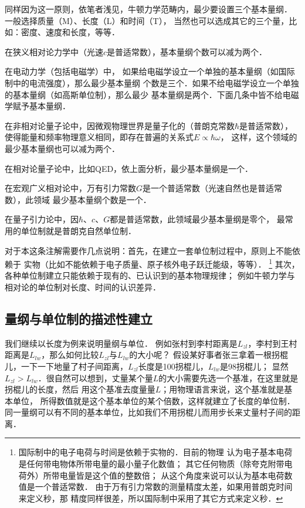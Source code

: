 \begin{remark}\label{chunit-dim:remark_num}
    同样因为这一原则，依笔者浅见，牛顿力学范畴内，最少要设置三个基本量纲．
    一般选择{\kaishu 质量}（M）、{\kaishu 长度}（L）和{\kaishu 时间}（T），
    当然也可以选成其它的三个量，比如：密度、速度和长度，等等．

    在狭义相对论力学中（光速$c$是普适常数），基本量纲个数可以减为两个．

    在电动力学（包括电磁学）中，%
    如果给电磁学设立一个单独的基本量纲（如国际制中的电流强度），那么最少基本量纲
    个数是三个．如果不给电磁学设立一个单独的基本量纲（如高斯单位制），那么最少
    基本量纲是两个．下面几条中皆不给电磁学赋予基本量纲．

    在非相对论量子论中，因微观物理世界是量子化的（普朗克常数$\hbar$是普适常数），
    使得能量和频率物理意义相同，即存在普遍的关系式$E \propto \hbar \omega $，
    这样，这个领域的最少基本量纲也可以减为两个．

    在相对论量子论中，比如QED，依上面分析，最少基本量纲是一个．

    在宏观广义相对论中，万有引力常数$G$是一个普适常数（光速自然也是普适常数），此领域
    最少基本量纲个数是一个．

    在量子引力论中，因$\hbar$、$c$、$G$都是普适常数，此领域最少基本量纲是零个，
    最常用的单位制就是普朗克自然单位制．

    对于本这条注解需要作几点说明：首先，在建立一套单位制过程中，原则上不能依赖于
    实物（比如不能依赖于电子质量、原子核外电子跃迁能级，等等）．
    {\footnote {国际制中的电子电荷与时间是依赖于实物的．目前的物理
    认为电子基本电荷是任何带电物体所带电量的最小量子化数值；
    其它任何物质（除夸克附带电荷外）所带电量皆是这个值的整数倍；
    从这个角度来说可以认为基本电荷数值是一个普适常数．
    由于万有引力常数的测量精度太差，如果用普朗克时间来定义秒，那
    精度同样很差，所以国际制中采用了其它方式来定义秒．}}
    其次，各种单位制建立只能依赖于现有的、已认识到的基本物理规律；
    例如牛顿力学与相对论的单位制对长度、时间的认识差异．
\end{remark}


\subsection{量纲与单位制的描述性建立}
我们继续以长度为例来说明量纲与单位．
例如张村到李村距离是$L_{zl}$，李村到王村距离是$L_{lw}$，那么如何比较$L_{zl}$与$L_{lw}$的大小呢？
假设某好事者张三拿着一根拐棍儿，一下一下地量了村子间距离，$L_{zl}$长度是100拐棍儿，$L_{lw}$是98拐棍儿；
显然$L_{zl} > L_{lw}$．很自然可以想到，丈量某个量$L$的大小需要先选一个基准，在这里就是拐棍儿的长度，然后
用这个基准去度量量$L$；用物理语言来说，这个基准就是{\heiti 基本单位}，
所得数值就是这个基本单位的某个倍数，这样就建立了{长度的单位制}．
同一量纲可以有不同的基本单位，比如我们不用拐棍儿而用{\kaishu 步长}来丈量村子间的距离．

